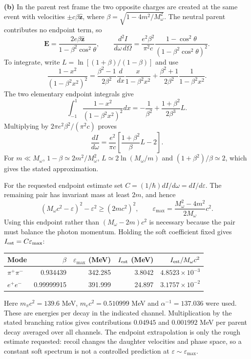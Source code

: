 \medskip\noindent\textbf{(b)} In the parent rest frame the two
opposite charges are created at the same event with velocities
$\pm c\beta\widehat{\mathbf z}$, where
$\beta=\sqrt{1-4m^2/M_\omega^2}$.  The neutral parent contributes
no endpoint term, so
\[
\mathbf E=\frac{2e\beta\widehat{\mathbf z}}
 {1-\beta^2\cos^2\theta},\qquad
\frac{d^2I}{d\omega\,d\Omega}
=\frac{e^2\beta^2}{\pi^2c}
\frac{1-\cos^2\theta}{(1-\beta^2\cos^2\theta)^2}.
\]
To integrate, write $L=\ln[(1+\beta)/(1-\beta)]$ and use
\[
\frac{1-x^2}{(1-\beta^2x^2)^2}
=\frac{\beta^2-1}{2\beta^2}
 \frac d{dx}\frac{x}{1-\beta^2x^2}
+\frac{\beta^2+1}{2\beta^2}\frac1{1-\beta^2x^2}.
\]
The two elementary endpoint integrals give
\[
\int_{-1}^1\frac{1-x^2}{(1-\beta^2x^2)^2}dx
=-\frac1{\beta^2}+\frac{1+\beta^2}{2\beta^3}L.
\]
Multiplying by $2\pi e^2\beta^2/(\pi^2c)$ proves
\[
\boxed{\frac{dI}{d\omega}=
\frac{e^2}{\pi c}\left[\frac{1+\beta^2}{\beta}L-2\right].}
\]
For $m\ll M_\omega$, $1-\beta\simeq2m^2/M_\omega^2$,
$L\simeq2\ln(M_\omega/m)$ and $(1+\beta^2)/\beta\simeq2$,
which gives the stated approximation.

For the requested endpoint estimate set
$C=(1/\hbar)dI/d\omega=dI/d\varepsilon$.  The remaining pair has
invariant mass at least $2m$, and hence
\[
(M_\omega c^2-\varepsilon)^2-\varepsilon^2\geq(2mc^2)^2,
\qquad
\varepsilon_{\max}=\frac{M_\omega^2-4m^2}{2M_\omega}c^2.
\]
Using this endpoint rather than $ (M_\omega-2m)c^2$ is necessary
because the pair must balance the photon momentum.  Holding the soft
coefficient fixed gives $I_{\rm est}=C\varepsilon_{\max}$:
\begin{center}
\begin{tabular}{lrrrr}
\toprule
Mode&$\beta$&$\varepsilon_{\max}$ (MeV)&$I_{\rm est}$ (MeV)&$I_{\rm est}/M_\omega c^2$\\
\midrule
$\pi^+\pi^-$&0.934439&342.285&3.8042&$4.8523\times10^{-3}$\\
$e^+e^-$&0.99999915&391.999&24.897&$3.1757\times10^{-2}$\\
\bottomrule
\end{tabular}
\end{center}
Here $m_\pi c^2=139.6$ MeV, $m_ec^2=0.510999$ MeV and
$\alpha^{-1}=137.036$ were used.  These are energies per decay in
the indicated channel.  Multiplication by the stated branching ratios
gives contributions $0.04945$ and $0.001992$ MeV per parent decay
averaged over all channels.  The endpoint extrapolation is only the
rough estimate requested: recoil changes the daughter velocities and
phase space, so a constant soft spectrum is not a controlled
prediction at $\varepsilon\sim\varepsilon_{\max}$.

